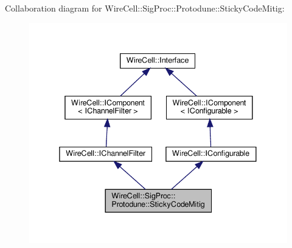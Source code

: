 Collaboration diagram for Wire\+Cell\+:\+:Sig\+Proc\+:\+:Protodune\+:\+:Sticky\+Code\+Mitig\+:
\nopagebreak
\begin{figure}[H]
\begin{center}
\leavevmode
\includegraphics[width=338pt]{class_wire_cell_1_1_sig_proc_1_1_protodune_1_1_sticky_code_mitig__coll__graph}
\end{center}
\end{figure}

